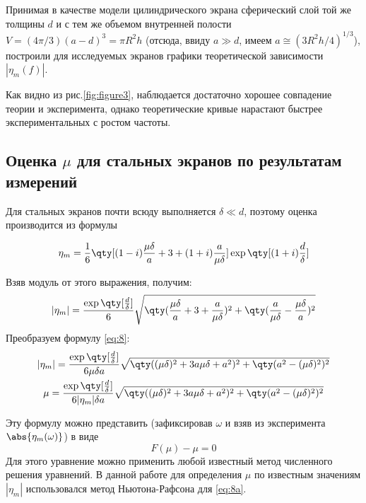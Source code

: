 Принимая в качестве модели цилиндрического экрана сферический слой той же толщины $d$ и с тем же объемом внутренней
полости $V=(4\pi/3)(a-d)^3=\pi R^2h$ (отсюда, ввиду $a\gg d$, имеем $a\cong (3R^2h/4)^{1/3}$), построили для исследуемых
экранов графики теоретической зависимости $|\eta_m(f)|$.

Как видно из рис.\ref{fig:figure3}, наблюдается достаточно хорошее совпадение теории и эксперимента, однако теоретические
кривые нарастают быстрее экспериментальных с ростом частоты.

\subsection{Оценка $\mu$ для стальных экранов по результатам измерений}

Для стальных экранов почти всюду выполняется $\delta \ll d$, поэтому оценка производится из формулы

\begin{gather}
	\eta_m = \frac16\qty[(1-i)\frac{\mu \delta}{a} + 3 + (1+i)\frac{a}{\mu \delta}]\exp\qty[(1+i)\frac{d}{\delta}]
\end{gather}

Взяв модуль от этого выражения, получим:
\begin{gather}
	|\eta_m| = \frac{\exp\qty[\frac{d}{\delta}]}{6}\sqrt{\qty(\frac{\mu \delta}{a} +3 + \frac{a}{\mu \delta} )^2 + \qty(\frac{a}{\mu \delta} - \frac{\mu \delta}{a})^2}
	\label{eq:8}
\end{gather}
Преобразуем формулу \eqref{eq:8}:
\begin{gather}
	|\eta_m| = \frac{\exp\qty[\frac{d}{\delta}]}{6 \mu \delta a}\sqrt{\qty((\mu \delta)^2 +3 a \mu \delta + a^2)^2 + \qty(a^2 - (\mu \delta)^2)^2}\\
%
	\mu = \frac{\exp\qty[\frac{d}{\delta}]}{6 |\eta_m| \delta a}\sqrt{\qty((\mu \delta)^2 +3 a \mu \delta + a^2)^2 + \qty(a^2 - (\mu \delta)^2)^2}
\end{gather}

Эту формулу можно представить (зафиксировав $\omega$ и взяв из эксперимента $\abs{\eta_m(\omega)}$) в виде
\begin{equation}
	\label{eq:8a}
	F(\mu)-\mu=0
\end{equation}
Для этого уравнение можно применить любой известный метод численного решения уравнений.
В данной работе для определения $\mu$ по известным значениям $|\eta_m|$ использовался  метод Ньютона-Рафсона для \eqref{eq:8a}.




